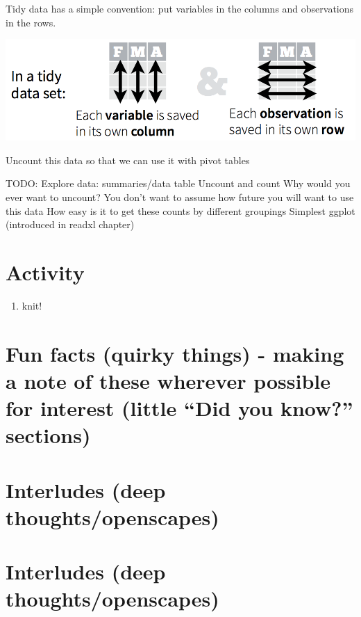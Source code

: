 \documentclass[]{book}
\providecommand{\tightlist}{%
  \setlength{\itemsep}{0pt}\setlength{\parskip}{0pt}}
\begin{document}
Tidy data has a simple convention: put variables in the columns and observations in the rows.

\includegraphics[width=0.8\linewidth]{img/tidy_data}

Uncount this data so that we can use it with pivot tables

TODO:
Explore data:
summaries/data table
Uncount and count
Why would you ever want to uncount? You don't want to assume how future you will want to use this data
How easy is it to get these counts by different groupings
Simplest ggplot (introduced in readxl chapter)

\hypertarget{activity-4}{%
\section{Activity}\label{activity-4}}

\begin{enumerate}
\def\labelenumi{\arabic{enumi}.}
\tightlist
\item
  knit!
\end{enumerate}

\hypertarget{fun-facts-quirky-things---making-a-note-of-these-wherever-possible-for-interest-little-did-you-know-sections}{%
\section{Fun facts (quirky things) - making a note of these wherever possible for interest (little ``Did you know?'' sections)}\label{fun-facts-quirky-things---making-a-note-of-these-wherever-possible-for-interest-little-did-you-know-sections}}

\hypertarget{interludes-deep-thoughtsopenscapes}{%
\section{Interludes (deep thoughts/openscapes)}\label{interludes-deep-thoughtsopenscapes}}

\hypertarget{interludes-deep-thoughtsopenscapes-1}{%
\section{Interludes (deep thoughts/openscapes)}\label{interludes-deep-thoughtsopenscapes-1}}
\end{document}
